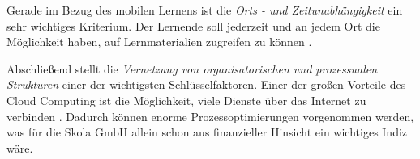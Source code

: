 Gerade im Bezug des mobilen Lernens ist die \textit{Orts - und Zeitunabhängigkeit} ein sehr wichtiges Kriterium. Der Lernende soll jederzeit und an jedem Ort die Möglichkeit haben, auf Lernmaterialien zugreifen zu können \cite{grella}.

Abschließend stellt die \textit{Vernetzung von organisatorischen und prozessualen Strukturen} einer der wichtigsten Schlüsselfaktoren. Einer der großen Vorteile des Cloud Computing ist die Möglichkeit, viele Dienste über das Internet zu verbinden \cite{krcmar}. Dadurch können enorme Prozessoptimierungen vorgenommen werden, was für die Skola GmbH allein schon aus finanzieller Hinsicht ein wichtiges Indiz wäre.
